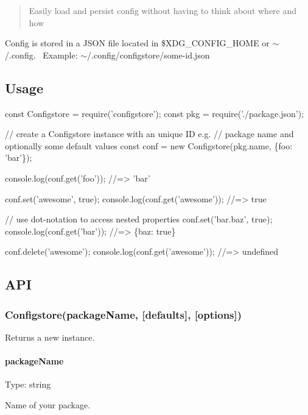 \begin{quote}
Easily load and persist config without having to think about where and how \end{quote}


Config is stored in a J\+S\+ON file located in {\ttfamily \$\+X\+D\+G\+\_\+\+C\+O\+N\+F\+I\+G\+\_\+\+H\+O\+ME} or {\ttfamily $\sim$/.config}.~\newline
 Example\+: {\ttfamily $\sim$/.config/configstore/some-\/id.\+json}

\subsection*{Usage}


\begin{DoxyCode}
const Configstore = require('configstore');
const pkg = require('./package.json');

// create a Configstore instance with an unique ID e.g.
// package name and optionally some default values
const conf = new Configstore(pkg.name, \{foo: 'bar'\});

console.log(conf.get('foo'));
//=> 'bar'

conf.set('awesome', true);
console.log(conf.get('awesome'));
//=> true

// use dot-notation to access nested properties
conf.set('bar.baz', true);
console.log(conf.get('bar'));
//=> \{baz: true\}

conf.delete('awesome');
console.log(conf.get('awesome'));
//=> undefined
\end{DoxyCode}


\subsection*{A\+PI}

\subsubsection*{Configstore(package\+Name, \mbox{[}defaults\mbox{]}, \mbox{[}options\mbox{]})}

Returns a new instance.

\paragraph*{package\+Name}

Type\+: {\ttfamily string}

Name of your package.

